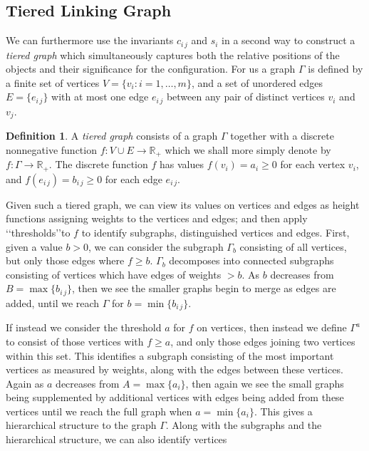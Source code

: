 \documentclass[10pt]{amsart}
\theoremstyle{definition}
\newtheorem{Definition}[Thm]{Definition}
\theoremstyle{definition}
\numberwithin{equation}{section}
\newcommand{\R}{{\mathbb R}}
\def \gG {\Gamma}
\begin{document}
\subsection*{Tiered Linking Graph}
\par
We can furthermore use the invariants $c_{i\, j}$ and $s_i$ in a second 
way to construct a {\em tiered graph} which simultaneously captures both 
the relative positions of the objects and their significance for the 
configuration.  For us a graph $\gG$ is defined by a finite set of vertices 
$V = \{v_i: i = 1, \dots , m\}$, and a set of unordered edges $E = \{e_{i\, 
j}\}$ with at most one edge $e_{i\, j}$ between any pair of distinct 
vertices $v_i$ and $v_j$. 
\begin{Definition}
A {\em tiered graph} consists of a graph $\gG$ together with a discrete 
nonnegative function $f: V \cup E \to \R_{+}$ which we shall more simply 
denote by $f: \gG \to \R_{+}$.  The discrete function $f$ has values $f(v_i) 
= a_i \geq 0$ for each vertex $v_i$, and $f(e_{i\, j}) = b_{i\, j} \geq 0$ for 
each edge $e_{i\, j}$.  
\end{Definition}
\par
Given such a tiered graph, we can view its values on vertices and edges as 
height functions assigning weights to the vertices and edges; and then 
apply \lq\lq thresholds\rq\rq to $f$ to identify subgraphs, distinguished 
vertices and edges.  First, given a value $b > 0$, we can consider the 
subgraph $\gG_b$ consisting of all vertices, but only those edges where $f 
\geq b$.  $\gG_b$ decomposes into connected subgraphs consisting of 
vertices which have edges of weights $> b$.  As $b$ decreases from $B = 
\max \{b_{i\, j}\}$, then we see the smaller graphs begin to merge as 
edges are added, until we reach $\gG$ for $b = \min \{b_{i\, j}\}$.  \par 
If instead we consider the threshold $a$ for $f$ on vertices, then instead 
we define $\gG^a$ to consist of those vertices with $f \geq a$, and only 
those edges joining two vertices within this set.  This identifies a 
subgraph consisting of the most important vertices as measured by 
weights, along with the edges between these vertices.  Again as $a$ 
decreases from $A = \max \{a_i\}$, then again we see the small graphs 
being supplemented by additional vertices with edges being added from 
these vertices until we reach the full graph when $a = \min \{a_i\}$.  This 
gives a hierarchical structure to the graph $\gG$.  Along with the 
subgraphs and the hierarchical structure, we can also identify vertices 
\end{document}
